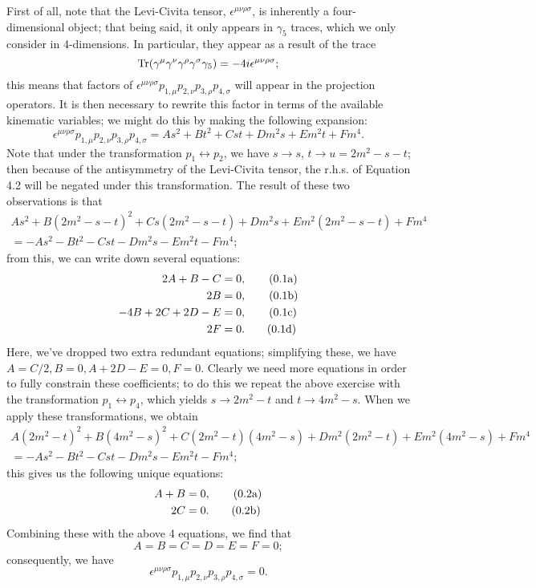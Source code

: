 \documentclass[12pt]{article}
\numberwithin{equation}{section}
\numberwithin{figure}{section}
\numberwithin{table}{section}
\newcommand{\numberthisa}{\addtocounter{equation}{1}\tag{\theequation a}}
\newcommand{\numberthisb}{\addtocounter{equation}{0}\tag{\theequation b}}
\newcommand{\numberthisc}{\addtocounter{equation}{0}\tag{\theequation c}}
\newcommand{\numberthisd}{\addtocounter{equation}{0}\tag{\theequation d}}
\renewcommand{\theequation}{\arabic{section}.\arabic{equation}}
\begin{document}
	First of all, note that the Levi-Civita tensor, \(\epsilon^{\mu\nu\rho\sigma}\), is inherently a four-dimensional object; that being said, it only appears in \(\gamma_5\) traces, which we only consider in 4-dimensions. In particular, they appear as a result of the trace  
	\begin{equation}
	\Tr(\gamma^\mu\gamma^\nu\gamma^\rho\gamma^\sigma\gamma_5)=-4i\epsilon^{\mu\nu\rho\sigma};
	\end{equation}
	this means that factors of \(\epsilon^{\mu\nu\rho\sigma}p_{1,\mu}p_{2,\nu}p_{3,\rho}p_{4,\sigma}\) will appear in the projection operators. It is then necessary to rewrite this factor in terms of the available kinematic variables; we might do this by making the following expansion:  
	\begin{equation}
	\epsilon^{\mu\nu\rho\sigma}p_{1,\mu}p_{2,\nu}p_{3,\rho}p_{4,\sigma}=As^2+Bt^2+Cst+Dm^2s+Em^2t+Fm^4.
	\end{equation}
	Note that under the transformation \(p_1\leftrightarrow p_2\), we have \(s\rightarrow s\), \(t\rightarrow u=2m^2-s-t\); then because of the antisymmetry of the Levi-Civita tensor, the r.h.s. of Equation 4.2 will be negated under this transformation. The result of these two observations is that  
	\begin{multline}
	As^2+B(2m^2-s-t)^2+Cs(2m^2-s-t)+Dm^2s+Em^2(2m^2-s-t)+Fm^4\\
	=-As^2-Bt^2-Cst-Dm^2s-Em^2t-Fm^4;
	\end{multline}
	from this, we can write down several equations:  
	\begin{align*}
	2A+B-C & =0, \numberthisa\\
	2B & =0, \numberthisb\\
	-4B+2C+2D-E & =0, \numberthisc\\
	2F & =0. \numberthisd
	\end{align*}
	Here, we've dropped two extra redundant equations; simplifying these, we have \(A=C/2,B=0,A+2D-E=0,F=0\). Clearly we need more equations in order to fully constrain these coefficients; to do this we repeat the above exercise with the transformation \(p_1\leftrightarrow p_4\), which yields \(s\rightarrow 2m^2-t\) and \(t\rightarrow 4m^2-s\). When we apply these transformations, we obtain  
	\begin{multline}
	A(2m^2-t)^2+B(4m^2-s)^2+C(2m^2-t)(4m^2-s)+Dm^2(2m^2-t)+Em^2(4m^2-s)+Fm^4\\
	=-As^2-Bt^2-Cst-Dm^2s-Em^2t-Fm^4;
	\end{multline}
	this gives us the following unique equations:  
	\begin{align*}
	A+B & =0, \numberthisa\\
	2C & =0. \numberthisb
	\end{align*}
	Combining these with the above 4 equations, we find that  
	\begin{equation}
	A=B=C=D=E=F=0;
	\end{equation}
	consequently, we have  
	\begin{equation}
	\boxed{\epsilon^{\mu\nu\rho\sigma}p_{1,\mu}p_{2,\nu}p_{3,\rho}p_{4,\sigma}=0.}
	\end{equation}
\end{document}

